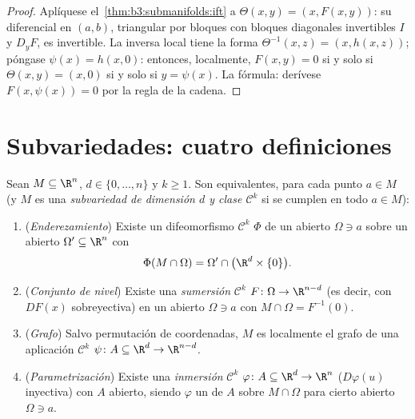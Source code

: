 \begin{proof}
Aplíquese el~\cref{thm:b3:submanifolds:ift} a $\Theta(x, y) = (x,
F(x,y))$: su diferencial en $(a,b)$, triangular por bloques con bloques
diagonales invertibles $I$ y $D_yF$, es invertible. La inversa local
tiene la forma $\Theta^{-1}(x, z) = (x, h(x,
z))$; póngase $\psi(x) = h(x, 0)$: entonces, localmente, $F(x, y) = 0$
si y solo si $\Theta(x,y) = (x, 0)$ si y solo si $y = \psi(x)$. La
fórmula: derívese $F(x, \psi(x)) = 0$ por la regla de la cadena.
\end{proof}

\section{Subvariedades: cuatro definiciones}

\begin{theorem}
\label{thm:b3:submanifolds:characterizations}
Sean $M \subseteq \R^n$, $d \in \{0, \dots, n\}$ y $k \geq
1$. Son equivalentes, para cada punto $a \in M$ (y $M$ es una
\emph{subvariedad de dimensión $d$ y clase
$\mathcal C^k$} si se cumplen en todo $a
\in M$):
\begin{enumerate}
  \item (\emph{Enderezamiento}) Existe un difeomorfismo $\mathcal C^k$
  $\Phi$ de un abierto $\Omega \ni a$ sobre un abierto
  $\Omega' \subseteq \R^n$ con
        \[
        \Phi(M\cap\Omega) = \Omega' \cap
        \bigl(\R^d\times\{0\}\bigr).
        \]
  \item (\emph{Conjunto de nivel}) Existe una \emph{sumersión}
  $\mathcal C^k$ $F \colon \Omega \to \R^{n-d}$ (es decir, con $DF(x)$
  sobreyectiva) en un abierto $\Omega \ni a$ con
  $M\cap\Omega = F^{-1}(0)$. \item (\emph{Grafo}) Salvo permutación de
  coordenadas, $M$ es localmente el grafo de una aplicación
  $\mathcal C^k$ $\psi
        \colon A \subseteq \R^d \to \R^{n-d}$. \item
  (\emph{Parametrización}) Existe una \emph{inmersión} $\mathcal C^k$
  $\varphi \colon A \subseteq \R^d \to
        \R^n$ ($D\varphi(u)$ inyectiva) con $A$ abierto, siendo
  $\varphi$ un  de $A$
  sobre $M \cap
        \Omega$ para cierto abierto $\Omega \ni a$.
\end{enumerate}
\end{theorem}

